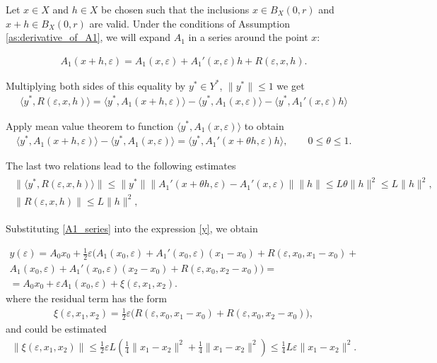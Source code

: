 \documentclass[../main.tex]{subfiles}
\begin{document}
Let $x \in X$ and $h \in X$ be chosen such that the inclusions $x\in B_X(0, r)$ and $x+h \in B_X(0, r)$ are valid.
Under the conditions of Assumption \ref{as:derivative_of_A1}, we will expand $A_1$ in a series around the point $x$:

\begin{gather}\label{A1_series}
	A_1(x + h,\varepsilon) = A_1(x,\varepsilon) + A_1'(x,\varepsilon) h + R(\varepsilon, x, h).
\end{gather}

Multiplying both sides of this equality by $y^* \in Y^*$, $\|y^*\| \leqslant 1$ we get
\begin{gather*}
	\langle y^*, R(\varepsilon, x, h) \rangle = 
	\langle y^*, A_1(x + h,\varepsilon) \rangle -
	\langle y^*, A_1(x,\varepsilon) \rangle -
	\langle y^*, A_1'(x,\varepsilon) h \rangle
\end{gather*}

Apply mean value theorem to function $\langle y^*, A_1(x,\varepsilon) \rangle$ to obtain
\begin{gather*}
	\langle y^*, A_1(x + h,\varepsilon) \rangle -
	\langle y^*, A_1(x,\varepsilon) \rangle = 
	\langle y^*, A_1'(x + \theta h,\varepsilon) h \rangle,
	\qquad
	0 \leqslant \theta \leqslant 1.
\end{gather*}

The last two relations lead to the following estimates
\begin{gather}
	\begin{gathered}
		\|\langle y^*, R(\varepsilon, x, h) \rangle \| \leqslant
		\| y^* \| 
		\| A_1'(x + \theta h,\varepsilon)  -
		A_1'(x,\varepsilon) \| 
		\| h  \| \leqslant 
		L \theta \|h\|^2 \leqslant
		L \|h\|^2, \\
		\| R(\varepsilon, x, h) \| \leqslant
		L \|h\|^2, 
	\end{gathered}
\end{gather}

Substituting \eqref{A1_series} into the expression \eqref{y}, we obtain

\begin{gather*}
	y(\varepsilon) =
	A_0x_0 +
	\frac{1}{2}\varepsilon \Big(
	A_1(x_0,\varepsilon) +
	A_1'(x_0,\varepsilon)(x_1 - x_0)+ 
	R(\varepsilon, x_0, x_1 - x_0) + \\ 
	A_1(x_0,\varepsilon) +
	A_1'(x_0,\varepsilon)(x_2 - x_0)+ 
	R(\varepsilon, x_0, x_2 - x_0)
	\Big) = \\ = 
	A_0x_0 + 
	\varepsilon A_1(x_0,\varepsilon) +
	\xi(\varepsilon,x_1,x_2).
\end{gather*}
where the residual term has the form
\begin{gather*}
	\xi(\varepsilon,x_1,x_2) = \frac{1}{2}\varepsilon\big(R(\varepsilon, x_0, x_1 - x_0) + R(\varepsilon, x_0, x_2 - x_0)\big),
\end{gather*}
and could be estimated
\begin{gather*}
	\|\xi(\varepsilon,x_1,x_2)\| \leqslant \frac{1}{2}\varepsilon L \left(\frac{1}{4}\|x_1 - x_2\|^2 + \frac{1}{4}\|x_1 - x_2\|^2 \right) \leqslant \frac{1}{4}L\varepsilon\|x_1 - x_2\|^2.   
\end{gather*}
\end{document}

